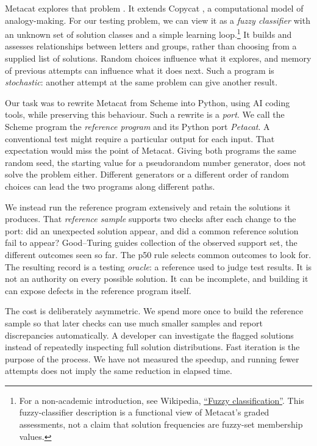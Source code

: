 \documentclass[10pt,letterpaper]{article}
\begin{document}
Metacat explores that problem \citep{ref21, ref22}. It extends Copycat
\citep{ref23, ref24}, a computational model of analogy-making. For our testing problem, we
can view it as a \emph{fuzzy classifier} with an unknown set of solution classes and a
simple learning loop.\footnote{For a non-academic introduction, see Wikipedia,
  \href{https://en.wikipedia.org/wiki/Fuzzy_classification}{``Fuzzy classification''}.
  This fuzzy-classifier description is a functional view of Metacat's graded assessments,
  not a claim that solution frequencies are fuzzy-set membership values.} It builds and
assesses relationships between letters and groups, rather than choosing from a supplied
list of solutions. Random choices influence what it explores, and memory of previous
attempts can influence what it does next. Such a program is \emph{stochastic}: another
attempt at the same problem can give another result.

Our task was to rewrite Metacat from Scheme into Python, using AI coding tools, while
preserving this behaviour. Such a rewrite is a \emph{port}. We call the Scheme program the
\emph{reference program} and its Python port \emph{Petacat}. A conventional test might
require a particular output for each input. That expectation would miss the point of
Metacat. Giving both programs the same random seed, the starting value for a pseudorandom
number generator, does not solve the problem either. Different generators or a different
order of random choices can lead the two programs along different paths.

We instead run the reference program extensively and retain the solutions it produces.
That \emph{reference sample} supports two checks after each change to the port: did an
unexpected solution appear, and did a common reference solution fail to appear?
Good--Turing guides collection of the observed support set, the different outcomes seen so
far. The p50 rule selects common outcomes to look for. The resulting record is a testing
\emph{oracle}: a reference used to judge test results. It is not an authority on every
possible solution. It can be incomplete, and building it can expose defects in the
reference program itself.

The cost is deliberately asymmetric. We spend more once to build the reference sample so
that later checks can use much smaller samples and report discrepancies automatically. A
developer can investigate the flagged solutions instead of repeatedly inspecting full
solution distributions. Fast iteration is the purpose of the process. We have not measured
the speedup, and running fewer attempts does not imply the same reduction in elapsed time.
\end{document}
